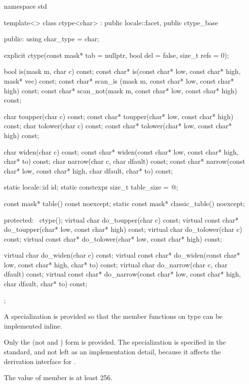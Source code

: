%
\begin{codeblock}
namespace std {
  template<>
    class ctype<char> : public locale::facet, public ctype_base {
    public:
      using char_type = char;

      explicit ctype(const mask* tab = nullptr, bool del = false, size_t refs = 0);

      bool is(mask m, char c) const;
      const char* is(const char* low, const char* high, mask* vec) const;
      const char* scan_is (mask m, const char* low, const char* high) const;
      const char* scan_not(mask m, const char* low, const char* high) const;

      char        toupper(char c) const;
      const char* toupper(char* low, const char* high) const;
      char        tolower(char c) const;
      const char* tolower(char* low, const char* high) const;

      char  widen(char c) const;
      const char* widen(const char* low, const char* high, char* to) const;
      char  narrow(char c, char dfault) const;
      const char* narrow(const char* low, const char* high, char dfault, char* to) const;

      static locale::id id;
      static constexpr size_t table_size = @\impdef@;

      const mask* table() const noexcept;
      static const mask* classic_table() noexcept;

    protected:
      ~ctype();
      virtual char        do_toupper(char c) const;
      virtual const char* do_toupper(char* low, const char* high) const;
      virtual char        do_tolower(char c) const;
      virtual const char* do_tolower(char* low, const char* high) const;

      virtual char        do_widen(char c) const;
      virtual const char* do_widen(const char* low, const char* high, char* to) const;
      virtual char        do_narrow(char c, char dfault) const;
      virtual const char* do_narrow(const char* low, const char* high,
                                    char dfault, char* to) const;
    };
}
\end{codeblock}

\pnum
A specialization  is provided
so that the member functions on type  can be implemented inline.
\begin{footnote}
Only the  (not  and )
form is provided.
The specialization is specified in the standard,
and not left as an implementation detail,
because it affects the derivation interface for .
\end{footnote}
The  value of
member  is at least 256.

